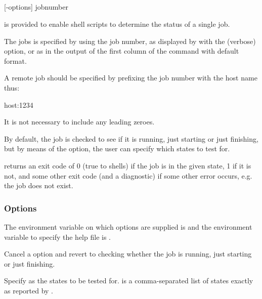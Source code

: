\subsection{\BtjstatName}

\begin{expara}

\BtjstatName{} [-options] jobnumber

\end{expara}

\PrBtjstat{} is provided to enable shell scripts to determine the status of a single job.

The jobs is specified by using the job number, as displayed by \PrBtr{} with the 
(verbose) option, or as in the output of the first column of the \PrBtjlist{} command with default format.

A remote job should be specified by prefixing the job number with the host name thus:

\begin{expara}

host:1234

\end{expara}

It is not necessary to include any leading zeroes.

By default, the job is checked to see if it is running, just starting or just finishing, but by means of the  option,
the user can specify which states to test for.

\PrBtjstat{} returns an exit code of 0 (true to shells) if the job is in the given state, 1 if it is not, and some
other exit code (and a diagnostic) if some other error occurs, e.g. the job does not exist.

\subsubsection{Options}
The environment variable on which options are supplied is \filename{\BtjstatVarname} and the environment variable to specify the
help file is .

\explainopt


Cancel a  option and revert to checking whether the job is running, just starting or just finishing.


Specify  as the states to be tested for. 
is a comma-separated list of states exactly as reported by \PrBtjlist{}.

